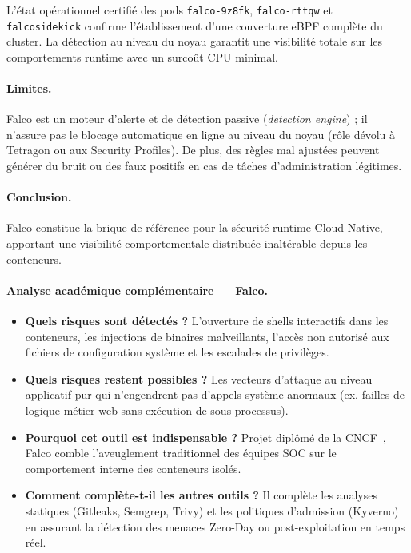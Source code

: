 \begin{tcolorbox}[colback=LightGray!30, colframe=clrBlue, arc=3pt, title={\small\bfseries Synthèse d'analyse critique — Falco Runtime}]
L'état opérationnel certifié des pods \texttt{falco-9z8fk}, \texttt{falco-rttqw} et \texttt{falcosidekick} confirme l'établissement d'une couverture eBPF complète du cluster. La détection au niveau du noyau garantit une visibilité totale sur les comportements runtime avec un surcoût CPU minimal.
\end{tcolorbox}

\paragraph{Limites.}
Falco est un moteur d'alerte et de détection passive (\textit{detection engine}) ; il n'assure pas le blocage automatique en ligne au niveau du noyau (rôle dévolu à Tetragon ou aux Security Profiles). De plus, des règles mal ajustées peuvent générer du bruit ou des faux positifs en cas de tâches d'administration légitimes.

\paragraph{Conclusion.}
Falco constitue la brique de référence pour la sécurité runtime Cloud Native, apportant une visibilité comportementale distribuée inaltérable depuis les conteneurs.

\paragraph{Analyse académique complémentaire — Falco.}
\begin{itemize}
    \item \textbf{Quels risques sont détectés ?} L'ouverture de shells interactifs dans les conteneurs, les injections de binaires malveillants, l'accès non autorisé aux fichiers de configuration système et les escalades de privilèges.
    \item \textbf{Quels risques restent possibles ?} Les vecteurs d'attaque au niveau applicatif pur qui n'engendrent pas d'appels système anormaux (ex. failles de logique métier web sans exécution de sous-processus).
    \item \textbf{Pourquoi cet outil est indispensable ?} Projet diplômé de la CNCF~\cite{falco_cncf_graduation_2024}, Falco comble l'aveuglement traditionnel des équipes SOC sur le comportement interne des conteneurs isolés.
    \item \textbf{Comment complète-t-il les autres outils ?} Il complète les analyses statiques (Gitleaks, Semgrep, Trivy) et les politiques d'admission (Kyverno) en assurant la détection des menaces Zero-Day ou post-exploitation en temps réel.
\end{itemize}


